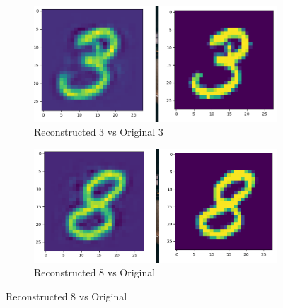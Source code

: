 \documentclass[a4paper,10pt]{article}
\begin{document}
 \begin{figure}[h]
 \begin{subfigure}{.5\textwidth}
 \centering
 \includegraphics[scale=0.29]{Results/LC-KSVD_X_ALL_K_1024/3_recons.png}
  \caption{Reconstructed 3 vs Original 3}
 \end{subfigure}%
  \begin{subfigure}{.3\textwidth}
 \centering
 \includegraphics[scale=0.29]{Results/LC-KSVD_X_ALL_K_1024/8_recons.png}
  \caption{Reconstructed 8 vs Original }

 \end{subfigure}%
\end{figure}
\end{document}
